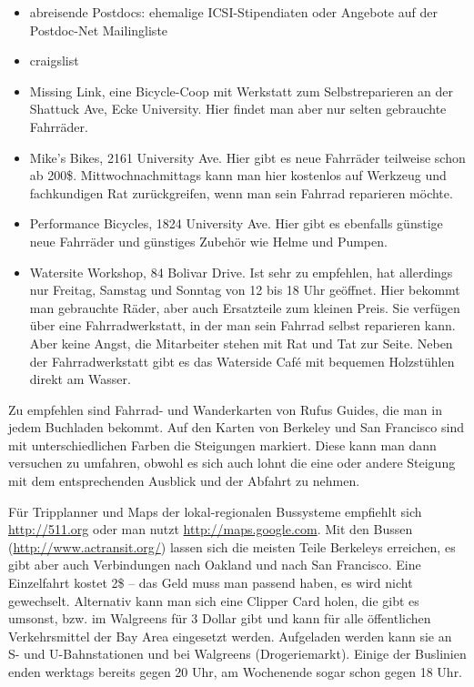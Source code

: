 \documentclass[a4paper]{scrreprt}
\begin{document}
\begin{itemize}
\item abreisende Postdocs: ehemalige ICSI-Stipendiaten oder Angebote
  auf der Postdoc-Net Mailingliste
\item craigslist
\item Missing Link, eine Bicycle-Coop mit Werkstatt zum
  Selbstreparieren an der Shattuck Ave, Ecke University. Hier findet man
  aber nur selten gebrauchte Fahrräder.
\item Mike's Bikes, 2161 University Ave. Hier gibt es neue Fahrräder
  teilweise schon ab 200\$. Mittwochnachmittags kann man hier kostenlos
  auf Werkzeug und fachkundigen Rat zurückgreifen, wenn man sein
  Fahrrad reparieren möchte.
\item Performance Bicycles, 1824 University Ave. Hier gibt es ebenfalls
  günstige neue Fahrräder und günstiges Zubehör wie Helme und Pumpen. 
\item Watersite Workshop, 84 Bolivar Drive. Ist sehr zu
  empfehlen, hat allerdings nur Freitag, Samstag und Sonntag von 12
  bis 18 Uhr geöffnet. Hier bekommt man gebrauchte Räder, aber auch Ersatzteile
  zum kleinen Preis. Sie verfügen über eine Fahrradwerkstatt, in der
  man sein Fahrrad selbst reparieren kann. Aber keine Angst, die Mitarbeiter
  stehen mit Rat und Tat zur Seite. Neben der Fahrradwerkstatt gibt es das
  Waterside Café mit bequemen Holzstühlen direkt am Wasser. 
\end{itemize}

Zu empfehlen sind Fahrrad- und Wanderkarten von Rufus Guides, die man
in jedem Buchladen bekommt. Auf den Karten von Berkeley und San
Francisco sind mit unterschiedlichen Farben die Steigungen
markiert. Diese kann man dann versuchen zu umfahren, obwohl es sich
auch lohnt die eine oder andere Steigung mit dem entsprechenden
Ausblick und der Abfahrt zu nehmen. 

Für Tripplanner und Maps der lokal-regionalen Bussysteme empfiehlt
sich \url{http://511.org} oder man nutzt
\url{http://maps.google.com}. Mit den Bussen
(\url{http://www.actransit.org/}) lassen sich die meisten Teile
Berkeleys erreichen, es gibt aber auch Verbindungen nach Oakland und
nach San Francisco. Eine Einzelfahrt kostet 2\$ -- das Geld muss man
passend haben, es wird nicht gewechselt. Alternativ kann man sich eine
Clipper Card holen, die gibt es umsonst, bzw. im Walgreens f\"ur 3 Dollar gibt und kann für alle öffentlichen
Verkehrsmittel der Bay Area eingesetzt werden. Aufgeladen werden kann
sie an S- und U-Bahnstationen und bei Walgreens
(Drogeriemarkt). Einige der Buslinien enden werktags bereits gegen 20
Uhr, am Wochenende sogar schon gegen 18 Uhr. 
\end{document}
